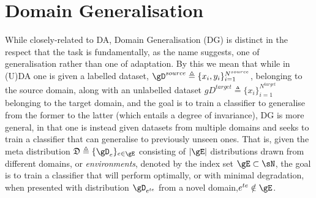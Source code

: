 \section{Domain Generalisation}\label{sec:domain_generalisation}
While closely-related to DA, Domain Generalisation (DG) is distinct in the respect that the task is
fundamentally, as the name suggests, one of \ood{} generalisation rather than one of adaptation.
%
By this we mean that while in (U)DA one is given a labelled dataset, \( \gD^{source} \triangleq
\{x_i, y_i \}_{i=1}^{N^{source}} \), belonging to the source domain, along with an unlabelled
dataset \( gD^{target} \triangleq \{ x_i \}_{i=1}^{N^{target}} \) belonging to the target domain,
and the goal is to train a classifier to generalise from the former to the latter (which entails a
degree of invariance), DG is more general, in that one is instead given datasets from multiple
domains and seeks to train a classifier that can generalise to previously unseen ones. 
%
That is, given the meta distribution \( \frak{D} \triangleq \{\gD_e \}_{e \in \gE} \) consisting of
\( |\gE| \) distributions drawn from different domains, or \emph{environments}, denoted by the
index set \( \gE \subset \sN \), the goal is to train a classifier that will perform optimally, or
with minimal degradation, when presented with distribution \( \gD_{e^{te}} \) from a novel
domain,\( e^{te} \notin  \gE \).


